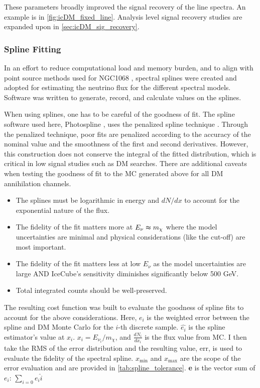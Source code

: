 These parameters broadly improved the signal recovery of the line spectra.
An example is in \cref{fig:icDM_fixed_line}.
Analysis level signal recovery studies are expanded upon in \cref{sec:icDM_sig_recovery}.

\subsubsection{Spline Fitting}\label{sec:icDM_splines}

In an effort to reduce computational load and memory burden, and to align with point source methods used for NGC1068 \cite{IC_NGC1068}, spectral splines were created and adopted for estimating the neutrino flux for the different spectral models.
Software was written to generate, record, and calculate values on the splines.

When using splines, one has to be careful of the goodness of fit.
The spline software used here, Photospline \cite{photospline}, uses the penalized spline technique \cite{penalized_spline}.
Through the penalized technique, poor fits are penalized according to the accuracy of the nominal value and the smoothness of the first and second derivatives.
However, this construction does not conserve the integral of the fitted distribution, which is critical in low signal studies such as DM searches.
There are additional caveats when testing the goodness of fit to the MC generated above for all DM annihilation channels.
\begin{itemize}
    \item The splines must be logarithmic in energy and $dN/dx$ to account for the exponential nature of the flux.
    \item The fidelity of the fit matters more at $ E_\nu \thickapprox m_\chi $ where the model uncertainties are minimal and physical considerations (like the cut-off) are most important.
    \item The fidelity of the fit matters less at low $ E_\nu $ as the model uncertainties are large AND IceCube's sensitivity diminishes significantly below 500 GeV.
    \item Total integrated counts should be well-preserved.
\end{itemize}
The resulting cost function was built to evaluate the goodness of spline fits to account for the above considerations.
\erriSpline
Here, $e_i$ is the weighted error between the spline and DM Monte Carlo for the $i$-th discrete sample.
$\hat{e_i} $ is the spline estimator's value at $x_i$.
$x_i = E_{\nu_i} / m_\chi$, and $\frac{dN_i}{dx_i}$ is the flux value from MC.
I then take the RMS of the error distribution and the resulting value, err, is used to evaluate the fidelity of the spectral spline.
\MSEspline
$x_\mathrm{min}$ and $x_\mathrm{max}$ are the scope of the error evaluation and are provided in \cref{tab:spline_tolerance}.
\textbf{e} is the vector sum of $e_i$: $\sum_{i=0} e_i \hat{i}$

